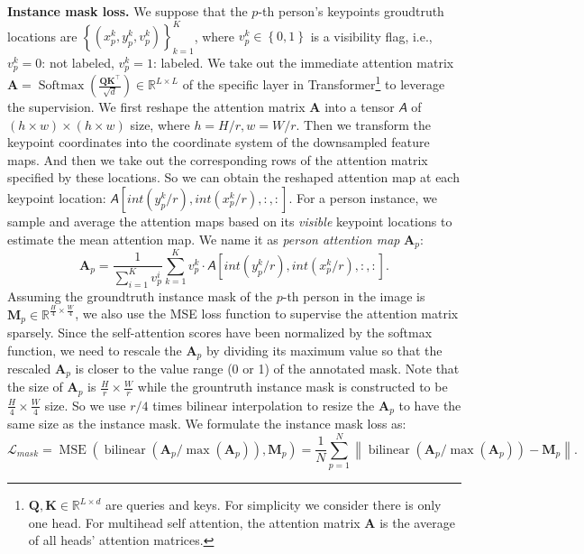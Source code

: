 \documentclass{article} \usepackage{iclr_conference,times}
\newcommand{\tens}[1]{\bm{\mathsfit{#1}}}
\def\tA{{\tens{A}}}
\begin{document}
{\bf Instance mask loss.} We suppose that the $p$-th person's keypoints groudtruth locations are $\left\{(x_p^k,y_p^k,v_p^k)\right\}_{k=1}^K$, where $v_p^k\in\left\{0,1\right\}$ is a visibility flag, i.e., $v_p^k=0$: not labeled, $v_p^k=1$: labeled. 
We take out the immediate attention matrix $\mathbf{A}=\operatorname{Softmax}(\frac{\mathbf{Q}\mathbf{K}^\top}{\sqrt{d}})\in \mathbb{R}^{L\times L}$ of the specific layer in Transformer\footnote{$\mathbf{Q},\mathbf{K}\in\mathbb{R}^{L\times d}$ are queries and keys. For simplicity we consider there is only one head. For multihead self attention, the attention matrix $\mathbf{A}$ is the average of all heads' attention matrices.} to leverage the supervision. 
We first reshape the attention matrix $\mathbf{A}$ into a tensor $\tA$ of $(h\times w) \times (h\times w)$ size, where $h=H/r,w=W/r$. 
Then we transform the keypoint coordinates into the coordinate system of the downsampled feature maps. 
And then we take out the corresponding rows of the attention matrix specified by these locations. 
So we can obtain the reshaped attention map at each keypoint location: $\tA[int(y_p^k/r),int(x_p^k/r),:,:]$. 
For a person instance, we sample and average the attention maps based on its \emph{visible} keypoint locations to estimate the mean attention map. 
We name it as \emph{person attention map} $\mathbf{A}_p$:
\begin{equation}
  \mathbf{A}_p=\frac{1}{\sum_{i=1}^Kv_p^i}\sum_{k=1}^K  v_p^k\cdot\tA[int(y_p^k/r),int(x_p^k/r),:,:].
\end{equation}
Assuming the groundtruth instance mask of the $p$-th person in the image is $\mathbf{M}_p\in \mathbb{R}^{\frac{H}{4}\times \frac{W}{4}}$, we also use the MSE loss function to supervise the attention matrix sparsely. 
Since the self-attention scores have been normalized by the softmax function, we need to rescale the $\mathbf{A}_p$ by dividing its maximum value so that the rescaled $\mathbf{A}_p$ is closer to the value range (0 or 1) of the annotated mask.
Note that the size of $\mathbf{A}_p$ is $\frac{H}{r}\times \frac{W}{r}$ while the grountruth instance mask is constructed to be $\frac{H}{4}\times \frac{W}{4}$ size. So we use $r/4$ times bilinear interpolation to resize the $\mathbf{A}_p$ to have the same size as the instance mask.
We formulate the instance mask loss as:
\begin{equation}
    \mathcal{L}_{mask}=\operatorname{MSE}(\operatorname{bilinear}(\mathbf{A}_p/\operatorname{max}(\mathbf{A}_p)),\mathbf{M}_p)=\frac{1}{N}\sum_{p=1}^N\left\|\operatorname{bilinear}(\mathbf{A}_p/\operatorname{max}({\mathbf{A}_p}))-\mathbf{M}_p\right\|.
\end{equation}
\end{document}
